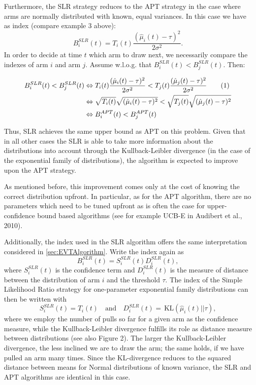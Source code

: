 \documentclass[11pt,]{article}
\newcommand{\KL}{\,\text{KL}}
\newcommand*{\Alignyesnumber}{\refstepcounter{equation}\tag{\theequation}}%
\begin{document}
Furthermore, the SLR strategy reduces to the APT strategy in the case
where arms are normally distributed with known, equal variances. In this
case we have as index (compare example 3 above): \[
B_i^{SLR}(t) = T_i(t)\frac{(\hat{\mu}_i(t) - \tau)^2}{2\sigma^2}.
\] In order to decide at time \(t\) which arm to draw next, we
necessarily compare the indexes of arm \(i\) and arm \(j\). Assume
w.l.o.g. that \(B_i^{SLR}(t) < B_j^{SLR}(t)\). Then:

\begin{align*}
B_i^{SLR}(t) < B_j^{SLR}(t) & \Leftrightarrow 
T_i(t)\frac{(\hat{\mu}_i(t) - \tau)^2}{2\sigma^2} < T_j(t)\frac{(\hat{\mu}_j(t) - \tau)^2}{2\sigma^2} \Alignyesnumber\label{eqn:SLRWithKnownVar}\\
& \Leftrightarrow 
\sqrt{T_i(t)}\sqrt{(\hat{\mu}_i(t) - \tau)^2} < \sqrt{T_j(t)}\sqrt{(\hat{\mu}_j(t) - \tau)^2} \\
& \Leftrightarrow 
B_i^{APT}(t) < B_j^{APT}(t)
\end{align*}

Thus, SLR achieves the same upper bound as APT on this problem. Given
that in all other cases the SLR is able to take more information about
the distributions into account through the Kullback-Leibler divergence
(in the case of the exponential family of distributions), the algorithm
is expected to improve upon the APT strategy.

As mentioned before, this improvement comes only at the cost of knowing
the correct distribution upfront. In particular, as for the APT
algorithm, there are no parameters which need to be tuned upfront as is
often the case for upper-confidence bound based algorithms (see for
example UCB-E in Audibert et al., 2010).

Additionally, the index used in the SLR algorithm offers the same
interpretation considered in \autoref{sec:EVTAlgorithm}. Write the index
again as \[
B_i^{SLR}(t) = S_i^{SLR}(t) D_i^{SLR}(t),
\] where \(S_i^{SLR}(t)\) is the confidence term and \(D_i^{SLR}(t)\) is
the measure of distance between the distribution of arm \(i\) and the
threshold \(\tau\). The index of the Simple Likelihood Ratio strategy
for one-parameter exponential family distributions can then be written
with \[
S_i^{SLR}(t) = T_i(t) \quad \text{and} \quad
D_i^{SLR}(t) = \KL(\hat{\mu}_i(t)||\tau),
\] where we employ the number of pulls so far for a given arm as the
confidence measure, while the Kullback-Leibler divergence fulfills its
role as distance measure between distributions (see also Figure 2). The
larger the Kullback-Leibler divergence, the less inclined we are to draw
the arm; the same holds, if we have pulled an arm many times. Since the
KL-divergence reduces to the squared distance between means for Normal
distributions of known variance, the SLR and APT algorithms are
identical in this case.
\end{document}
